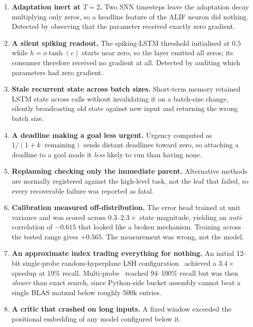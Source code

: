 \documentclass[10pt,twocolumn]{article}
\begin{document}
\begin{enumerate}
\item \textbf{Adaptation inert at $T=2$.} Two SNN timesteps leave the
adaptation decay multiplying only zeros, so a headline feature of the ALIF
neuron did nothing. Detected by observing that the parameter received exactly
zero gradient.

\item \textbf{A silent spiking readout.} The spiking-LSTM threshold initialised
at $0.5$ while $h = o\tanh(c)$ starts near zero, so the layer emitted all
zeros; its consumer therefore received no gradient at all. Detected by auditing
which parameters had zero gradient.

\item \textbf{Stale recurrent state across batch sizes.} Short-term memory
retained LSTM state across calls without invalidating it on a batch-size
change, silently broadcasting old state against new input and returning the
wrong batch size.

\item \textbf{A deadline making a goal less urgent.} Urgency computed as
$1/(1+k\cdot\text{remaining})$ sends distant deadlines toward zero, so attaching
a deadline to a goal made it \emph{less} likely to run than having none.

\item \textbf{Replanning checking only the immediate parent.} Alternative
methods are normally registered against the high-level task, not the leaf that
failed, so every recoverable failure was reported as fatal.

\item \textbf{Calibration measured off-distribution.} The error head trained at
unit variance and was scored across $0.3$--$2.3\times$ state magnitude, yielding
an \emph{anti}-correlation of $-0.615$ that looked like a broken mechanism.
Training across the tested range gives $+0.565$. The measurement was wrong, not
the model.

\item \textbf{An approximate index trading everything for nothing.} An initial
12-bit single-probe random-hyperplane LSH
configuration~\cite{indyk1998,charikar2002} achieved a $3.4\times$ speedup at
$19\%$ recall. Multi-probe~\cite{lv2007} reached 94--100\% recall but was then
\emph{slower} than exact search, since Python-side bucket assembly cannot beat
a single BLAS matmul below roughly 500k entries.

\item \textbf{A critic that crashed on long inputs.} A fixed window exceeded the
positional embedding of any model configured below it.

\end{enumerate}
\end{document}
